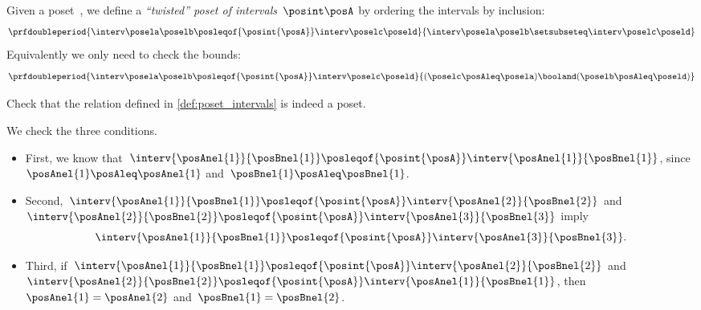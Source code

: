 \begin{marginfigure}
    \centering
    \caption{
        $\interv \posela \poselb
            \posleqof{\posint{\posA}}
            \interv \poselc \poseld$
    }
\end{marginfigure}

\begin{definition}
    \label{def:poset_intervals}
    Given a poset~\posA, we define a \emph{``twisted'' poset of intervals}~$\posint\posA$
    by ordering the intervals by inclusion:
    \begin{equation}
        \prfdoubleperiod{
            \interv \posela \poselb
            \posleqof{\posint{\posA}}
            \interv \poselc \poseld
        }{
            \interv \posela \poselb
            \setsubseteq
            \interv \poselc \poseld
        }
    \end{equation}
    Equivalently we only need to check the bounds:
    \begin{equation}
        \prfdoubleperiod{
            \interv \posela \poselb
            \posleqof{\posint{\posA}}
            \interv \poselc \poseld
        }{
            (\poselc \posAleq \posela ) \booland (\poselb \posAleq \poseld)
        }
    \end{equation}

\end{definition}

\begin{exercise}
    Check that the relation defined in \cref{def:poset_intervals} is indeed a poset.
\end{exercise}
\begin{solution}
    We check the three conditions.
    \begin{itemize}
        \item First, we know that~$\interv{\posAnel{1}}{\posBnel{1}}\posleqof{\posint{\posA}}\interv{\posAnel{1}}{\posBnel{1}}$, since~$\posAnel{1}\posAleq \posAnel{1}$ and~$\posBnel{1}\posAleq \posBnel{1}$.
        \item Second,~$\interv{\posAnel{1}}{\posBnel{1}}\posleqof{\posint{\posA}}\interv{\posAnel{2}}{\posBnel{2}}$ and~$\interv{\posAnel{2}}{\posBnel{2}}\posleqof{\posint{\posA}}\interv{\posAnel{3}}{\posBnel{3}}$ imply
              \begin{equation}
                  \interv{\posAnel{1}}{\posBnel{1}}\posleqof{\posint{\posA}}\interv{\posAnel{3}}{\posBnel{3}}.
              \end{equation}
        \item Third, if~$\interv{\posAnel{1}}{\posBnel{1}}\posleqof{\posint{\posA}}\interv{\posAnel{2}}{\posBnel{2}}$ and~$\interv{\posAnel{2}}{\posBnel{2}}\posleqof{\posint{\posA}}\interv{\posAnel{1}}{\posBnel{1}}$, then~$\posAnel{1}=\posAnel{2}$ and~$\posBnel{1}=\posBnel{2}$.
    \end{itemize}
\end{solution}

